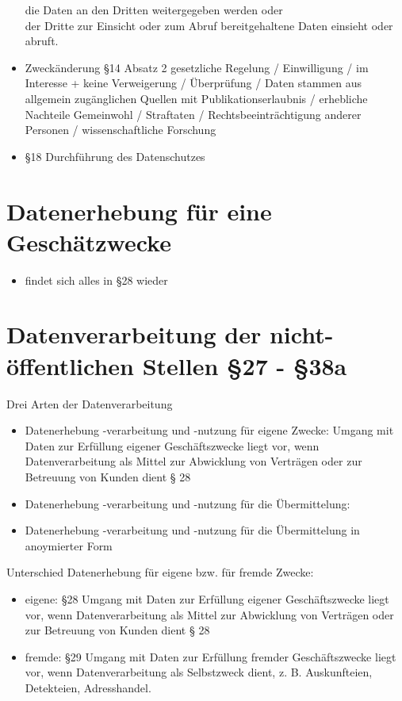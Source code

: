 \documentclass[a4paper,10pt]{scrartcl}
\begin{document}
\begin{itemize}
die Daten an den Dritten weitergegeben werden oder \\
der Dritte zur Einsicht oder zum Abruf bereitgehaltene Daten einsieht oder abruft.
 \item Zweckänderung §14 Absatz 2 gesetzliche Regelung / Einwilligung / im Interesse + keine Verweigerung / Überprüfung /
 Daten stammen aus allgemein zugänglichen Quellen mit Publikationserlaubnis / erhebliche Nachteile Gemeinwohl / Straftaten
 / Rechtsbeeinträchtigung anderer Personen / wissenschaftliche Forschung\\
 
 \item §18 Durchführung des Datenschutzes
 
\end{itemize}

\section{ Datenerhebung für eine Geschätzwecke}
\begin{itemize}
 \item findet sich alles in §28 wieder
\end{itemize}


\section{ Datenverarbeitung der nicht-öffentlichen Stellen §27 - §38a}
Drei Arten der Datenverarbeitung
\begin{itemize}
 \item Datenerhebung -verarbeitung und -nutzung für eigene Zwecke: Umgang mit Daten zur Erfüllung eigener Geschäftszwecke liegt vor,
 wenn Datenverarbeitung als Mittel zur Abwicklung von Verträgen oder zur Betreuung von Kunden dient § 28
 \item Datenerhebung -verarbeitung und -nutzung für die Übermittelung: 
 \item Datenerhebung -verarbeitung und -nutzung für die Übermittelung in anoymierter Form
\end{itemize}
Unterschied Datenerhebung für eigene bzw. für fremde Zwecke:
\begin{itemize}
 \item eigene: §28 Umgang mit Daten zur Erfüllung eigener Geschäftszwecke liegt vor,
 wenn Datenverarbeitung als Mittel zur Abwicklung von Verträgen oder zur Betreuung von Kunden dient § 28
 \item fremde: §29 Umgang mit Daten zur Erfüllung fremder 
Geschäftszwecke liegt vor, wenn Datenverarbeitung als 
Selbstzweck dient, z. B. Auskunfteien, Detekteien, 
Adresshandel. 
\end{itemize}
\end{document}
